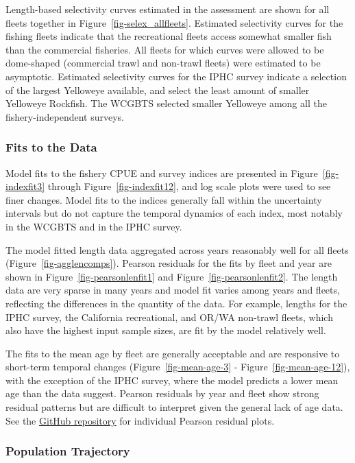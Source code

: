 \documentclass[
]{scrartcl}
\begin{document}
Length-based selectivity curves estimated in the assessment are shown
for all fleets together in Figure~\ref{fig-selex_allfleets}. Estimated
selectivity curves for the fishing fleets indicate that the recreational
fleets access somewhat smaller fish than the commercial fisheries. All
fleets for which curves were allowed to be dome-shaped (commercial trawl
and non-trawl fleets) were estimated to be asymptotic. Estimated
selectivity curves for the IPHC survey indicate a selection of the
largest Yelloweye available, and select the least amount of smaller
Yelloweye Rockfish. The WCGBTS selected smaller Yelloweye among all the
fishery-independent surveys.

\subsubsection{Fits to the Data}\label{fits-to-the-data}

Model fits to the fishery CPUE and survey indices are presented in
Figure~\ref{fig-indexfit3} through Figure~\ref{fig-indexfit12}, and log
scale plots were used to see finer changes. Model fits to the indices
generally fall within the uncertainty intervals but do not capture the
temporal dynamics of each index, most notably in the WCGBTS and in the
IPHC survey.

The model fitted length data aggregated across years reasonably well for
all fleets (Figure~\ref{fig-agglencomps}). Pearson residuals for the
fits by fleet and year are shown in Figure~\ref{fig-pearsonlenfit1} and
Figure~\ref{fig-pearsonlenfit2}. The length data are very sparse in many
years and model fit varies among years and fleets, reflecting the
differences in the quantity of the data. For example, lengths for the
IPHC survey, the California recreational, and OR/WA non-trawl fleets,
which also have the highest input sample sizes, are fit by the model
relatively well.

The fits to the mean age by fleet are generally acceptable and are
responsive to short-term temporal changes (Figure~\ref{fig-mean-age-3} -
Figure~\ref{fig-mean-age-12}), with the exception of the IPHC survey,
where the model predicts a lower mean age than the data suggest. Pearson
residuals by year and fleet show strong residual patterns but are
difficult to interpret given the general lack of age data. See the
\href{https://github.com/rclairer/Sebastes_ruberrimus_2025}{GitHub
repository} for individual Pearson residual plots.

\subsubsection{Population Trajectory}\label{population-trajectory}
\end{document}
